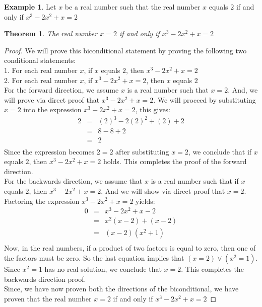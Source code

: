\documentclass{book}
\newtheorem{theorem}{Theorem}[section]
\theoremstyle{definition}
\newtheorem{example}{Example}[definition]
\theoremstyle{remark}
\begin{document}
\begin{example}
Let $x$ be a real number such that the real number $x$ equals $2$ if and only if $x^3 - 2x^2 + x = 2$

\begin{tcolorbox}
	\begin{theorem}
		The real number $x = 2$ if and only if $x^3 - 2x^2 + x = 2 $
	\end{theorem}
\end{tcolorbox}

\begin{proof}
We will prove this biconditional statement by proving the following two conditional statements: \\
1. For each real number $x$, if $x$ equals $2$, then $x^3 -2x^2 + x = 2$ \\
2. For each real number $x$, if $x^3 -2x^2 + x = 2$, then $x$ equals $2$ \\

For the forward direction, we assume $x$ is a real number such that $x = 2$. And, we will prove via direct proof that $x^3 -2x^2 + x = 2$. We will proceed by substituting $x = 2$ into the expression $x^3 -2x^2 + x = 2$, this gives:
	\begin{eqnarray*}
		2 & = & (2)^3 -2(2)^2 + (2) + 2 \nonumber \\
		& = & 8 - 8 + 2 \nonumber \\
		& = & 2 \nonumber \\
	\end{eqnarray*}
Since the expression becomes $2 = 2$ after substituting $x = 2$, we conclude that if $x$ equals $2$, then $x^3 -2x^2 + x = 2$ holds. This completes the proof of the forward direction. \\
For the backwards direction, we assume that $x$ is a real number such that if $x$ equals $2$, then $x^3 -2x^2 + x = 2$. And we will show via direct proof that $x = 2$. Factoring the expression $x^3 -2x^2 + x = 2$ yields: 
	\begin{eqnarray*}
		0 & = & x^3 -2x^2 + x - 2 \nonumber \\
		& = & x^2(x - 2) + (x - 2) \nonumber \\
		& = & (x - 2)(x^2 + 1) \nonumber \\
	\end{eqnarray*}
Now, in the real numbers, if a product of two factors is equal to zero, then one of the factors must be zero. So the last equation implies that $ (x = 2) \vee (x^2 = 1)$. Since $x^2 = 1$ has no real solution, we conclude that $x = 2$. This completes the backwards direction  proof. \\
Since, we have now proven both the directions of the biconditional, we have proven that the real number $x = 2$ if and only if $x^3 - 2x^2 + x = 2 $
\end{proof}

\end{example}
\end{document}
